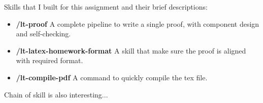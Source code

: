 \documentclass{article}
\begin{document}
\medskip

Skills that I built for this assignment and their brief descriptions:

\begin{itemize}
\item \textbf{/lt-proof} A complete pipeline to write a single proof, with component design and self-checking.
\item \textbf{/lt-latex-homework-format} A skill that make sure the proof is aligned with required format.
\item \textbf{/lt-compile-pdf} A command to quickly compile the tex file.
\end{itemize}

Chain of skill is also interesting...
\end{document}
